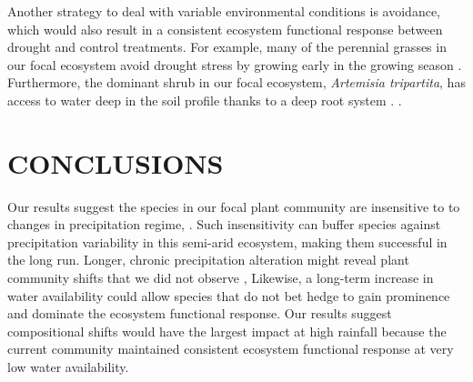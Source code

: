 \documentclass[fleqn,10pt,lineno]{wlpeerj} %
\begin{document}
Another strategy to deal with variable environmental conditions is
avoidance, which would also result in a consistent ecosystem functional
response between drought and control treatments. For example, many of
the perennial grasses in our focal ecosystem avoid drought stress by
growing early in the growing season \citep[A.R. Kleinhesselink, personal
observation]{Blaisdell1958}. Furthermore, the dominant shrub in our
focal ecosystem, \emph{Artemisia tripartita}, has access to water deep
in the soil profile thanks to a deep root system
\citep{Kulmatiski2017a}.
\citep[e.g.,][]{Huxman2004, Knapp2015, Wilcox2017}.


\hypertarget{conclusions}{%
\section{CONCLUSIONS}\label{conclusions}}

Our results suggest the species in our focal plant community are
insensitive to to changes in precipitation regime,
. Such insensitivity
can buffer species against precipitation variability in this semi-arid
ecosystem, making them successful in the long run. Longer, chronic
precipitation alteration might reveal plant community shifts that we did
not observe \citep[e.g.,][]{Wilcox2016},
Likewise, a long-term increase in water availability could allow species
that do not bet hedge to gain prominence and dominate the ecosystem
functional response.
Our results suggest compositional shifts would have the largest impact
at high rainfall because the current community maintained consistent
ecosystem functional response at very low water availability.
\end{document}
